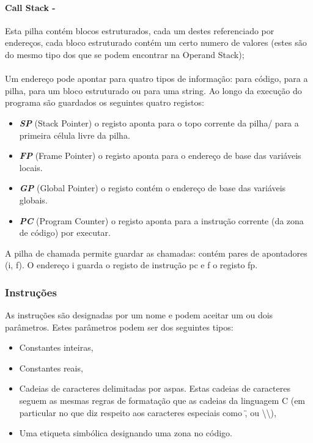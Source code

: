 \documentclass{report}
\begin{document}
\paragraph{\quad Call Stack -}
Esta pilha contém blocos estruturados, cada um destes referenciado por endereços, cada bloco
estruturado contém um certo numero de valores (estes são do mesmo tipo dos que se podem encontrar na Operand Stack);
\\
\\
\null\quad Um endereço pode apontar para quatro tipos de informação: para código, para a
pilha, para um bloco estruturado ou para uma string.
Ao longo da execução do programa são guardados os seguintes quatro registos:
\begin{itemize}
	\item \textit{\textbf{SP}} (Stack Pointer) o registo aponta para o topo corrente da pilha/ para a primeira célula livre da pilha.
	\item \textit{\textbf{FP}} (Frame Pointer) o registo aponta para o endereço de base das variáveis locais.
	\item \textit{\textbf{GP}} (Global Pointer) o registo contém o endereço de base das variáveis globais.
	\item \textit{\textbf{PC}} (Program Counter) o registo aponta para a instrução corrente (da zona de código) por executar.
\end{itemize}

A pilha de chamada permite guardar as chamadas: contém pares de apontadores
(i, f). O endereço i guarda o registo de instrução pc e f o registo fp.

\subsubsection{Instruções}

\quad As instruções são designadas por um nome e podem aceitar um ou dois parâmetros.
Estes parâmetros podem ser dos seguintes tipos:
\begin{itemize}
\item Constantes inteiras,
\item Constantes reais,
\item Cadeias de caracteres delimitadas por aspas. Estas cadeias de caracteres seguem as
mesmas regras de formatação que as cadeias da linguagem C (em particular no que
diz respeito aos caracteres especiais como \", \n ou \textbackslash\textbackslash ),
\item Uma etiqueta simbólica designando uma zona no código.
\end{itemize}
\end{document}
